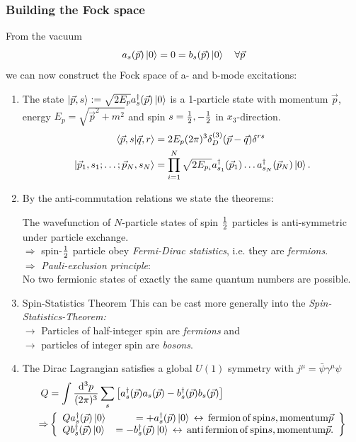 \subsubsection{Building the Fock space}
From the vacuum 
\begin{equation}
	a_s(\vec{p})\ket{0} = 0 = b_s(\vec{p}) \ket{0} \quad \forall \vec{p}
\end{equation}
we can now construct the Fock space of a- and b-mode excitations:
\begin{enumerate}
	\item The state $\ket{\vec{p},s} :=\sqrt{2E_p}a^{\dagger}_s(\vec{p})\ket{0}$ is a 1-particle state with momentum $ \vec{p}$, energy $E_p=\sqrt{\vec{p}^2+m^2}$ and spin $s=\frac{1}{2},-\frac{1}{2}$ in $x_3$-direction.
	\begin{align}
		\braket{\vec{p},s}{\vec{q},r} &= 2 E_p (2 \pi)^3 \delta^{(3)}_D(\vec{p}-\vec{q}) \delta^{rs} \\
		\ket{\vec{p}_1,s_1;\dots;\vec{p}_N,s_N} &= \prod_{i=1}^{N} \sqrt{2 E_{p_i}} a^{\dagger}_{s_1} (\vec{p}_1) \dots a^{\dagger}_{s_N} (\vec{p}_N) \ket{0}.
	\end{align}
\item By the anti-commutation relations we state the theorems:
\begin{statements}
	The wavefunction of $N$-particle states of spin $\frac{1}{2}$ particles is anti-symmetric under particle exchange.\\
	$\Rightarrow$ spin-$\frac{1}{2}$ particle obey \emph{Fermi-Dirac statistics}, i.e. they are \emph{fermions}.\\
	$\Rightarrow$ \emph{Pauli-exclusion principle}:\\
	No two fermionic states of exactly the same quantum numbers are possible.
\end{statements}
\item \begin{mybox}{Spin-Statistics Theorem}
	This can be cast more generally into the \emph{Spin-Statistics-Theorem:}\\
	$\rightarrow$ Particles of half-integer spin are \emph{fermions} and \\
	$\rightarrow$ particles of integer spin are \emph{bosons}.
\end{mybox}
\item The Dirac Lagrangian satisfies a global $U(1)$ symmetry with $j^{\mu} =\bar{\psi} \gamma^{\mu} \psi$\\
\begin{align}
	Q&= \int \frac{\mathrm{d}^3 p}{(2 \pi)^3} \sum_s \left[a^{\dagger}_s(\vec{p})a_s(\vec{p})  -b^{\dagger}_s(\vec{p}) b_s(\vec{p}) \right]\\
	\Rightarrow & \left\{		\begin{array}{lr}
		Qa^{\dagger}_s(\vec{p}) \ket{0} &=+a^{\dagger}_s(\vec{p}) \ket{0} \, \leftrightarrow\, \mathrm{fermion\, of \, spin} s, \mathrm{momentum} \vec{p} \\
		Q b^{\dagger}_s(\vec{p}) \ket{0} &=-b^{\dagger}_s(\vec{p}) \ket{0} \, \leftrightarrow \, \mathrm{anti \, fermion \, of \, spin} s, \mathrm{momentum} \vec{p}.
	\end{array}		\right\}
\end{align}


\end{enumerate}
